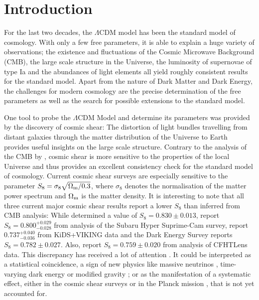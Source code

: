 \chapter{Introduction}
\label{sec:intro}

For the last two decades, the $\Lambda$CDM model has been the standard model of cosmology. With only a few free parameters, it is able to explain a huge variety of observations; the existence and fluctuations of the Cosmic Microwave Background (CMB), the large scale structure in the Universe, the luminosity of supernovae of type Ia and the abundances of light elements all yield roughly consistent results for the standard model. Apart from the nature of Dark Matter and Dark Energy, the challenges for modern cosmology are the precise determination of the free parameters as well as the search for possible extensions to the standard model.

One tool to probe the $\Lambda$CDM Model and determine its parameters was provided by the discovery of cosmic shear: The distortion of light bundles travelling from distant galaxies through the matter distribution of the Universe to Earth provides useful insights on the large scale structure. Contrary to the analysis of the CMB by \citet{2018arXiv180706209P}, cosmic shear is more sensitive to the properties of the local Universe and thus provides an excellent consistency check for the standard model of cosmology. Current cosmic shear surveys are especially sensitive to the parameter $S_8=\sigma_8 \sqrt{\Omega_{\rm m}/0.3}$, where $\sigma_8$ denotes the normalisation of the matter power spectrum and $\Omega_{\rm m}$ is the matter density.
It is interesting to note that all three current major cosmic shear results report a lower $S_8$ than inferred from CMB analysis: While \citet{2018arXiv180706209P} determined a value of $S_8 = 0.830 \pm 0.013$, 
\citet{2018arXiv180909148H} report $S_8 = 0.800^{+0.029}_{-0.028}$ from analysis of the Subaru Hyper Suprime-Cam survey, \citet{2018arXiv181206076H} report $0.737_{-0.036}^{+0.040}$ from KiDS+VIKING data and the Dark Energy Survey \citep{2018PhRvD..98d3528T} reports $S_8=0.782\pm 0.027$. Also, \citet{2013MNRAS.432.2433H} report $S_8 = 0.759 \pm 0.020$ from analysis of CFHTLens data. This discrepancy has received a lot of attention \citep{2013PDU.....2..166V}. It could be interpreted as a statistical coincidence, a sign of new physics like massive neutrinos \citep{2014PhRvL.112e1303B}, time-varying dark energy or modified gravity \citep{2016A&A...594A..14P}; or as the manifestation of a systematic effect, either in the cosmic shear surveys or in the Planck mission \citep{2016ApJ...818..132A}, that is not yet accounted for. 

